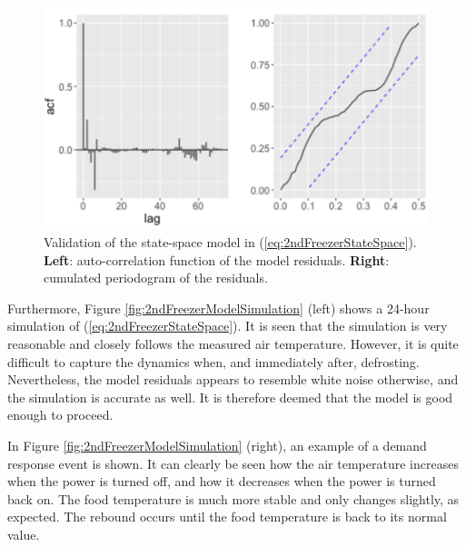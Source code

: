 \begin{figure}[!t]
    \centering
    \includegraphics[width=\columnwidth]{../figures/2ndFreezerModelValidation.png}
    \caption{ Validation of the state-space model in (\ref{eq:2ndFreezerStateSpace}). \textbf{Left}: auto-correlation function of the model residuals. \textbf{Right}: cumulated periodogram of the residuals.}
    \label{fig:2ndFreezerModelValidation}
\end{figure}

Furthermore, Figure \ref{fig:2ndFreezerModelSimulation} (left) shows a 24-hour simulation of (\ref{eq:2ndFreezerStateSpace}). It is seen that the simulation is very reasonable and closely follows the measured air temperature. However, it is quite difficult to capture the dynamics when, and immediately after, defrosting. Nevertheless, the model residuals appears to resemble white noise otherwise, and the simulation is accurate as well. It is therefore deemed that the model is good enough to proceed.

In Figure \ref{fig:2ndFreezerModelSimulation} (right), an example of a demand response event is shown. It can clearly be seen how the air temperature increases when the power is turned off, and how it decreases when the power is turned back on. The food temperature is much more stable and only changes slightly, as expected. The rebound occurs until the food temperature is back to its normal value.

